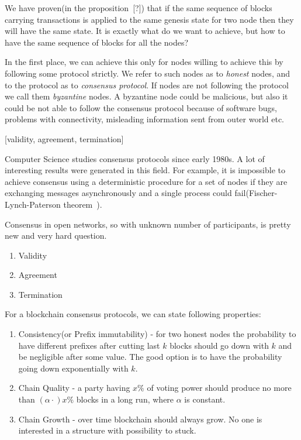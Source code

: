 \documentclass[]{report}   %
\begin{document}
We have proven(in the proposition~[?]) that if the same sequence of blocks carrying transactions is applied to the same genesis state for two node then they will have the same state. It is exactly what do we want to achieve, but how to have the same sequence of blocks for all the nodes? 

In the first place, we can achieve this only for nodes willing to achieve this by following some protocol strictly. We refer to such nodes as to \textit{honest} nodes, and to the protocol as to \textit{consensus protocol}. If nodes are not following the protocol we call them \textit{byzantine} nodes. A byzantine node could be malicious, but also it could be not able to follow the consensus protocol because of software bugs, problems with connectivity, misleading information sent from outer world etc. 

[validity, agreement, termination]

Computer Science studies consensus protocols since early 1980s. A lot of interesting results were generated in this field. For example, it is impossible to achieve consensus using a deterministic procedure for a set of nodes if they are exchanging messages asynchronously and a single process could fail(Fischer-Lynch-Paterson theorem~\cite{fischer1985impossibility}). 

Consensus in open networks, so with unknown number of participants, is pretty new and very hard question. 

\begin{enumerate}
\item{Validity}
\item{Agreement}
\item{Termination}
\end{enumerate}

For a blockchain consensus protocols, we can state following properties:

\begin{enumerate}
\item{Consistency(or Prefix immutability)} - for two honest nodes the probability to have different prefixes after cutting last \(k\) blocks should go down with \(k\) and be negligible after some value. The good option is to have the probability going down exponentially with \(k\).
\item{Chain Quality} - a party having \(x\%\) of voting power should produce no more than \((\alpha \cdot) x \%\) blocks in a long run, where \(\alpha\) is constant.
\item{Chain Growth} - over time blockchain should always grow. No one is interested in a structure with possibility to stuck. 
\end{enumerate}
\end{document}
